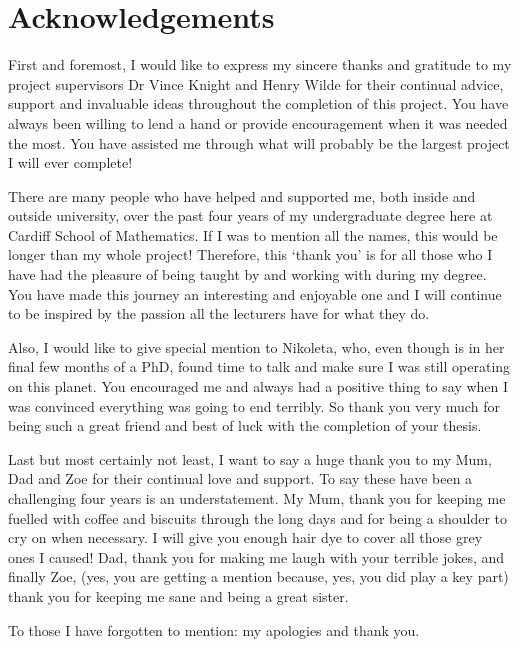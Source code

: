 \chapter{Acknowledgements}

First and foremost, I would like to express my sincere thanks and gratitude to
my project supervisors Dr Vince Knight and Henry Wilde for their continual
advice, support and invaluable ideas throughout the completion of this project.
You have always been willing to lend a hand or provide encouragement when
it was needed the most. You have assisted me
through what will probably be the largest project I will ever complete!

There are many people who have helped and supported me, both inside and outside
university, over the past four years of my undergraduate degree here at Cardiff
School of Mathematics. If I was to mention all the names, this would be longer
than my whole project! Therefore, this `thank you' is for all those who I have
had the pleasure of being taught by and working with during my degree. You have
made this journey an interesting and enjoyable one and I will continue to be
inspired by the passion all the lecturers have for what they do. 

Also, I would like to give special mention to Nikoleta, who, even though is in
her final few months of a PhD, found time
to talk and make sure I was still operating on this planet. You
encouraged me and always had a positive thing to say when I was convinced
everything was going to end terribly. So thank you very much for being
such a great friend and best of luck with the completion of your thesis.

Last but most certainly not least, I want to say a huge thank you to my Mum, Dad
and Zoe for their continual love and support. To say these have been a
challenging four years is an understatement. My
Mum, thank you for keeping me fuelled with coffee and biscuits through the long
days and for being a shoulder to cry on when necessary. I will give you enough
hair dye to cover all those grey ones I caused! Dad, thank you for making me
laugh with your terrible jokes, and finally Zoe, (yes, you are
getting a mention because, yes, you did play a key part) thank you for keeping
me sane and being a great sister.

To those I have forgotten to mention: my apologies and thank
you.